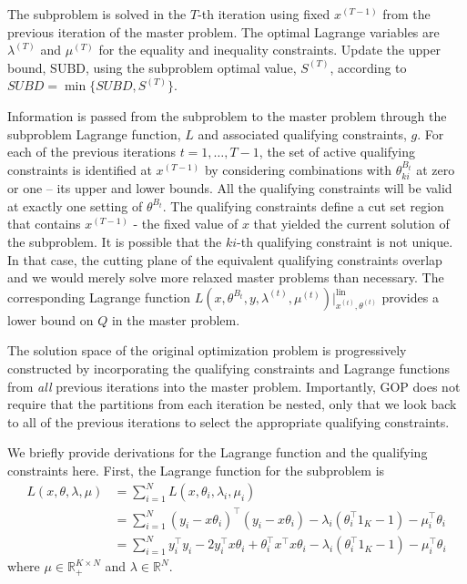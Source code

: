 \documentclass{article} %
\newcommand{\RR}{\ensuremath{\mathbb{R}}}
\newcommand{\T}{\ensuremath{\top}}
\begin{document}
The subproblem is solved in the $T$-th iteration using fixed $x^{(T-1)}$ from
the previous iteration of the master problem. The optimal Lagrange variables are
$\lambda^{(T)}$ and $\mu^{(T)}$ for the equality and inequality constraints.
Update the upper bound, $\text{SUBD}$, using the subproblem optimal value,
$S^{(T)}$, according to $SUBD = \min\{SUBD, S^{(T)} \}$.


 Information is passed from the subproblem to the master problem
through the subproblem Lagrange function, $L$ and associated qualifying
constraints, $g$. For each of the previous iterations $t=1, \ldots, T-1$, the
set of active qualifying constraints is identified at $x^{(T-1)}$ by
considering combinations with $\theta^{B_t}_{ki}$ at zero or one -- its upper
and lower bounds. All the qualifying constraints will be valid at exactly one
setting of $\theta^{B_t}$. The qualifying constraints define a cut set region
that contains $x^{(T-1)}$ - the fixed value of $x$ that yielded the current
solution of the subproblem. It is possible that the $ki$-th qualifying
constraint is not unique. In that case, the cutting plane of the equivalent
qualifying constraints overlap and we would merely solve more relaxed master
problems than necessary. The corresponding Lagrange function
$L(x,\theta^{B_t},y,\lambda^{(t)},\mu^{(t)})\big\vert^{\text{lin}}_{x^{(t)},
\theta^{(t)}}$ provides a lower bound on $Q$ in the master problem.



The solution space of the original optimization problem is progressively
constructed by incorporating the qualifying constraints and Lagrange functions
from \textit{all} previous iterations into the master problem. Importantly, GOP
does not require that the partitions from each iteration be nested, only that
we look back to all of the previous iterations to select the appropriate
qualifying constraints.


We briefly provide derivations for the Lagrange function and the qualifying constraints here. First, the Lagrange function for the subproblem is 
\begin{equation}\label{eqn:lagrange1}
    \begin{split}
    L(x, \theta, \lambda, \mu) &= \sum_{i=1}^N L(x, \theta_i, \lambda_i, \mu_i)\\
    &= \sum_{i=1}^N (y_i - x \theta_i)^\T (y_i - x\theta_i) - \lambda_i (\theta_i^\T 1_K - 1) - \mu_i^\T \theta_i\\
    &= \sum_{i=1}^N y_i^\T y_i -2 y_i^\T x \theta_i + \theta_i^\T x^\T x \theta_i - \lambda_i (\theta_i^\T 1_K - 1) - \mu_i^\T \theta_i
    \end{split}
\end{equation}
where $\mu \in \RR_+^{K \times N}$ and $\lambda \in \RR^N$.
\end{document}
